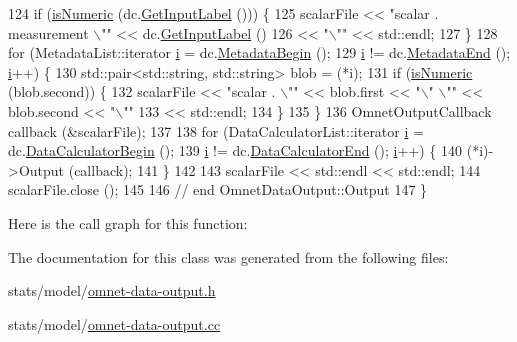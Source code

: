 \begin{DoxyCode}
124   \textcolor{keywordflow}{if} (\hyperlink{omnet-data-output_8cc_af747a0cbe4349a7cad54557b77696865}{isNumeric} (dc.\hyperlink{classns3_1_1DataCollector_a9a1807ddc67f99a76709e9a4107887d7}{GetInputLabel} ())) \{
125       scalarFile << \textcolor{stringliteral}{"scalar . measurement \(\backslash\)""} << dc.\hyperlink{classns3_1_1DataCollector_a9a1807ddc67f99a76709e9a4107887d7}{GetInputLabel} ()
126                  << \textcolor{stringliteral}{"\(\backslash\)""} << std::endl;
127     \}
128   \textcolor{keywordflow}{for} (MetadataList::iterator \hyperlink{bernuolliDistribution_8m_a6f6ccfcf58b31cb6412107d9d5281426}{i} = dc.\hyperlink{classns3_1_1DataCollector_a46dcf81704797c44d7194e7f14b43452}{MetadataBegin} ();
129        \hyperlink{bernuolliDistribution_8m_a6f6ccfcf58b31cb6412107d9d5281426}{i} != dc.\hyperlink{classns3_1_1DataCollector_a49eac13159763a8ef234677e76afc708}{MetadataEnd} (); \hyperlink{bernuolliDistribution_8m_a6f6ccfcf58b31cb6412107d9d5281426}{i}++) \{
130       std::pair<std::string, std::string> blob = (*i);
131       \textcolor{keywordflow}{if} (\hyperlink{omnet-data-output_8cc_af747a0cbe4349a7cad54557b77696865}{isNumeric} (blob.second)) \{
132           scalarFile << \textcolor{stringliteral}{"scalar . \(\backslash\)""} << blob.first << \textcolor{stringliteral}{"\(\backslash\)" \(\backslash\)""} << blob.second << \textcolor{stringliteral}{"\(\backslash\)""}
133                      << std::endl;
134         \}
135     \}
136   OmnetOutputCallback callback (&scalarFile);
137 
138   \textcolor{keywordflow}{for} (DataCalculatorList::iterator \hyperlink{bernuolliDistribution_8m_a6f6ccfcf58b31cb6412107d9d5281426}{i} = dc.\hyperlink{classns3_1_1DataCollector_a22716600bb9685d1da74ddef53355e6f}{DataCalculatorBegin} ();
139        \hyperlink{bernuolliDistribution_8m_a6f6ccfcf58b31cb6412107d9d5281426}{i} != dc.\hyperlink{classns3_1_1DataCollector_a26e656c86a375228ae49645c387ad201}{DataCalculatorEnd} (); \hyperlink{bernuolliDistribution_8m_a6f6ccfcf58b31cb6412107d9d5281426}{i}++) \{
140       (*i)->Output (callback);
141     \}
142 
143   scalarFile << std::endl << std::endl;
144   scalarFile.close ();
145 
146   \textcolor{comment}{// end OmnetDataOutput::Output}
147 \}
\end{DoxyCode}


Here is the call graph for this function\+:




The documentation for this class was generated from the following files\+:\begin{DoxyCompactItemize}
\item 
stats/model/\hyperlink{omnet-data-output_8h}{omnet-\/data-\/output.\+h}\item 
stats/model/\hyperlink{omnet-data-output_8cc}{omnet-\/data-\/output.\+cc}\end{DoxyCompactItemize}
